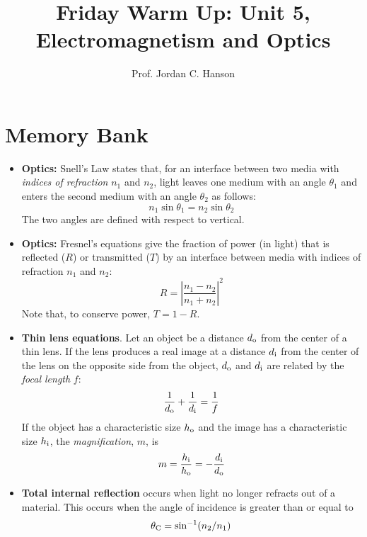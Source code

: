 \documentclass{article}
\begin{document}
\twocolumn

\title{Friday Warm Up: Unit 5, Electromagnetism and Optics}
\author{Prof. Jordan C. Hanson}

\maketitle

\section{Memory Bank}

\begin{itemize}
\item \textbf{Optics:} Snell's Law states that, for an interface between two media with \textit{indices of refraction} $n_1$ and $n_2$, light leaves one medium with an angle $\theta_1$ and enters the second medium with an angle $\theta_2$ as follows:
\begin{equation}
n_1 \sin\theta_1 = n_2\sin\theta_2
\end{equation}
\noindent The two angles are defined with respect to vertical.
\item \textbf{Optics:} Fresnel's equations give the fraction of power (in light) that is reflected ($R$) or transmitted ($T$) by an interface between media with indices of refraction $n_1$ and $n_2$:
\begin{equation}
R = \left| \frac{n_1 - n_2}{n_1 + n_2} \right|^2 \label{eq:2}
\end{equation}
\noindent Note that, to conserve power, $T = 1 - R$.
\item \textbf{Thin lens equations}.  Let an object be a distance $d_{\rm o}$ from the center of a thin lens.  If the lens produces a real image at a distance $d_{\rm i}$ from the center of the lens on the opposite side from the object, $d_{\rm o}$ and $d_{\rm i}$ are related by the \textit{focal length} $f$:
\begin{equation}
\frac{1}{d_{\rm o}}+\frac{1}{d_{\rm i}} = \frac{1}{f}
\end{equation}
If the object has a characteristic size $h_{\rm o}$ and the image has a characteristic size $h_{\rm i}$, the \textit{magnification}, $m$, is
\begin{equation}
m = \frac{h_{\rm i}}{h_{\rm o}} = -\frac{d_{\rm i}}{d_{\rm o}}
\end{equation}
\item \textbf{Total internal reflection} occurs when light no longer refracts out of a material.  This occurs when the angle of incidence is greater than or equal to
\begin{equation}
\theta_{\rm C} = \sin^{-1}(n_2/n_1)
\end{equation}
\end{itemize}
\end{document}
